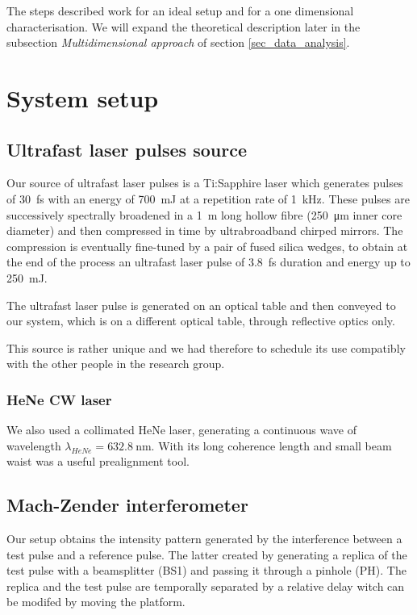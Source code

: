 \documentclass[12pt,a4paper,twoside]{article}
\begin{document}
The steps described work for an ideal setup and for a one dimensional characterisation.
We will expand the theoretical description later in the subsection \textit{Multidimensional approach} of section \ref{sec_data_analysis}.

\section{System setup}
\subsection{Ultrafast laser pulses source}
Our source of ultrafast laser pulses is a Ti:Sapphire laser which generates pulses of \SI{30}{\fs} with an energy of \SI{700}{\milli\J} at a repetition rate of \SI{1}{\kHz}.
These pulses are successively spectrally broadened in a \SI{1}{\m} long hollow fibre (\SI{250}{\um} inner core diameter) and then compressed in time by ultrabroadband chirped mirrors.
The compression is eventually fine-tuned by a pair of fused silica wedges, to obtain at the end of the process an ultrafast laser pulse of \SI{3.8}{\fs} duration and energy up to \SI{250}{\milli\J}.

The ultrafast laser pulse is generated on an optical table and then conveyed to our system, which is on a different optical table, through reflective optics only.

This source is rather unique and we had therefore to schedule its use compatibly with the other people in the research group.

\subsubsection*{HeNe CW laser}
We also used a collimated HeNe laser, generating a continuous wave of wavelength $\lambda_{HeNe}=\SI{632.8}{\nm}$.
With its long coherence length and small beam waist was a useful prealignment tool.

\subsection{Mach-Zender interferometer}
Our setup obtains the intensity pattern generated by the interference between a test pulse and a reference pulse.
The latter created by generating a replica of the test pulse with a beamsplitter (BS1) and passing it through a pinhole (PH).
The replica and the test pulse are temporally separated by a relative delay witch can be modifed by moving the platform.
\end{document}
